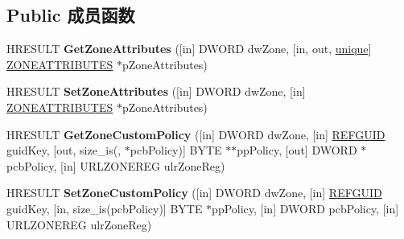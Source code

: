 \subsection*{Public 成员函数}
\begin{DoxyCompactItemize}
\item 
\mbox{\label{interface_i_internet_zone_manager_ab114613904f72fec63617b4c6a67a8af}} 
H\+R\+E\+S\+U\+LT {\bfseries Get\+Zone\+Attributes} (\mbox{[}in\mbox{]} D\+W\+O\+RD dw\+Zone, \mbox{[}in, out, \hyperlink{interfaceunique}{unique}\mbox{]} \hyperlink{struct_i_internet_zone_manager_1_1___z_o_n_e_a_t_t_r_i_b_u_t_e_s}{Z\+O\+N\+E\+A\+T\+T\+R\+I\+B\+U\+T\+ES} $\ast$p\+Zone\+Attributes)
\item 
\mbox{\label{interface_i_internet_zone_manager_a7f29f820049c442ed995af0b681b7813}} 
H\+R\+E\+S\+U\+LT {\bfseries Set\+Zone\+Attributes} (\mbox{[}in\mbox{]} D\+W\+O\+RD dw\+Zone, \mbox{[}in\mbox{]} \hyperlink{struct_i_internet_zone_manager_1_1___z_o_n_e_a_t_t_r_i_b_u_t_e_s}{Z\+O\+N\+E\+A\+T\+T\+R\+I\+B\+U\+T\+ES} $\ast$p\+Zone\+Attributes)
\item 
\mbox{\label{interface_i_internet_zone_manager_a0cdbed2e9d630d233cd214fc1cf526ef}} 
H\+R\+E\+S\+U\+LT {\bfseries Get\+Zone\+Custom\+Policy} (\mbox{[}in\mbox{]} D\+W\+O\+RD dw\+Zone, \mbox{[}in\mbox{]} \hyperlink{struct___g_u_i_d}{R\+E\+F\+G\+U\+ID} guid\+Key, \mbox{[}out, size\+\_\+is(, $\ast$pcb\+Policy)\mbox{]} B\+Y\+TE $\ast$$\ast$pp\+Policy, \mbox{[}out\mbox{]} D\+W\+O\+RD $\ast$pcb\+Policy, \mbox{[}in\mbox{]} U\+R\+L\+Z\+O\+N\+E\+R\+EG ulr\+Zone\+Reg)
\item 
\mbox{\label{interface_i_internet_zone_manager_aabd189cf2e50848d2c974285117cee31}} 
H\+R\+E\+S\+U\+LT {\bfseries Set\+Zone\+Custom\+Policy} (\mbox{[}in\mbox{]} D\+W\+O\+RD dw\+Zone, \mbox{[}in\mbox{]} \hyperlink{struct___g_u_i_d}{R\+E\+F\+G\+U\+ID} guid\+Key, \mbox{[}in, size\+\_\+is(pcb\+Policy)\mbox{]} B\+Y\+TE $\ast$pp\+Policy, \mbox{[}in\mbox{]} D\+W\+O\+RD pcb\+Policy, \mbox{[}in\mbox{]} U\+R\+L\+Z\+O\+N\+E\+R\+EG ulr\+Zone\+Reg)
\item 
\mbox{\label{interface_i_internet_zone_manager_a24b5dde93e0abae5e4fa58759c73b2db}} 
$$
\end{DoxyCompactItemize}
